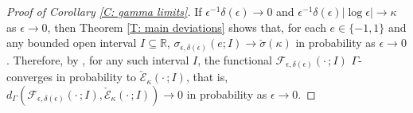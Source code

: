 \documentclass[10pt,a4paper]{amsart}
\begin{document}
\begin{proof}[Proof of Corollary \ref{C: gamma limits}] If $\epsilon^{-1} \delta(\epsilon) \to 0$ and $\epsilon^{-1} \delta(\epsilon) |\log \epsilon| \to \kappa$ as $\epsilon \to 0$, then Theorem \ref{T: main deviations} shows that, for each $e \in \{-1,1\}$ and any bounded open interval $I \subseteq \mathbb{R}$,  $\sigma_{\epsilon,\delta(\epsilon)}(e;I) \to \check{\sigma}(\kappa)$ in probability as $\epsilon \to 0$. Therefore, by \cite[Theorem 4]{part1}, for any such interval $I$, the functional $\mathscr{F}_{\epsilon,\delta(\epsilon)}(\cdot \, ;I)$ $\Gamma$-converges in probability to $\check{\mathscr{E}}_{\kappa}(\cdot \, ;I)$, that is, $d_{\Gamma} ( \mathscr{F}_{\epsilon,\delta(\epsilon)}(\cdot \,;I), \check{\mathscr{E}}_{\kappa}(\cdot \,;I)) \to 0$ in probability as $\epsilon \to 0$.\end{proof}
\end{document}
